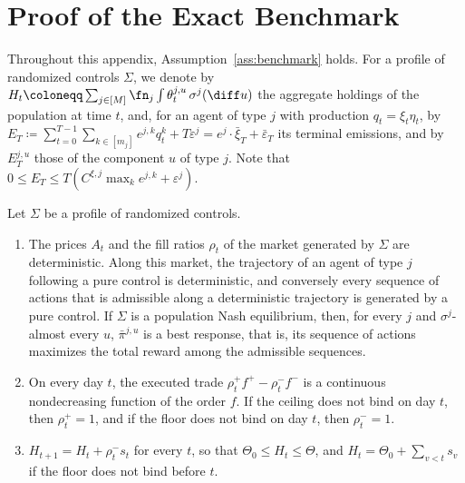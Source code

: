 
\ifdefined\benchmarkstandalone\appendix\fi  %
\section{Proof of the Exact Benchmark}
\label{app:benchmark_lp}

    Throughout this appendix, Assumption~\ref{ass:benchmark} holds. For a profile of randomized controls $\Sigma$, we denote by $H_t \coloneqq \sum_{j \in [M]} \fn_j \int \theta^{j,u}_t \, \sigma^j(\diff u)$ the aggregate holdings of the population at time $t$, and, for an agent of type $j$ with production $q_t = \xi_t \eta_t$, by $E_T \coloneqq \sum_{t=0}^{T-1} \sum_{k \in [m_j]} e^{j,k} q^k_t + T \varepsilon^j = e^j \cdot \bar\xi_T + \bar\varepsilon_T$ its terminal emissions, and by $E^{j,u}_T$ those of the component $u$ of type $j$. Note that $0 \le E_T \le T(C^{\xi,j} \max_k e^{j,k} + \varepsilon^j)$.

    \begin{lemma}
        \label{lem:benchmark_deterministic}
        Let $\Sigma$ be a profile of randomized controls.
        \begin{enumerate}
            \item The prices $A_t$ and the fill ratios $\rho_t$ of the market generated by $\Sigma$ are deterministic. Along this market, the trajectory of an agent of type $j$ following a pure control is deterministic, and conversely every sequence of actions that is admissible along a deterministic trajectory is generated by a pure control. If $\Sigma$ is a population Nash equilibrium, then, for every $j$ and $\sigma^j$-almost every $u$, $\bar\pi^{j,u}$ is a best response, that is, its sequence of actions maximizes the total reward among the admissible sequences.
            \item On every day $t$, the executed trade $\rho^+_t f^+ - \rho^-_t f^-$ is a continuous nondecreasing function of the order $f$. If the ceiling does not bind on day $t$, then $\rho^+_t = 1$, and if the floor does not bind on day $t$, then $\rho^-_t = 1$.
            \item $H_{t+1} = H_t + \rho^-_t s_t$ for every $t$, so that $\Theta_0 \le H_t \le \Theta$, and $H_t = \Theta_0 + \sum_{v < t} s_v$ if the floor does not bind before $t$.
        \end{enumerate}
    \end{lemma}


